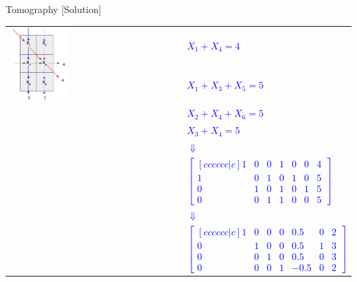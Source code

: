 \begin{frame}{Tomography [Solution]}
    \textcolor{blue}{
        \begin{tabular}{m{} m{}}
            \multirow{2}{*}{\includegraphics[width = 0.35\textwidth]{images/tomography-problem.png}} & 
            $X_1+ X_4 = 4$ \\
            & $X_1 + X_3 + X_5 = 5$ \\[-0.5ex]
            & $X_2 + X_4 + X_6 = 5$ \\[-0.5ex]
            & $X_3+ X_4 = 5$ \\
            & \quad\quad\quad\quad$\Downarrow$ \\
            & $\begin{bmatrix}[cccccc|c]
                1 & 0 & 0 & 1 & 0 & 0 & 4 \\
                1 & 0 & 1 & 0 & 1 & 0 & 5 \\
                0 & 1 & 0 & 1 & 0 & 1 & 5 \\
                0 & 0 & 1 & 1 & 0 & 0 & 5
            \end{bmatrix}$ \\
            & \quad\quad\quad\quad$\Downarrow$ \\
            & $\begin{bmatrix}[cccccc|c]
                1 & 0 & 0 & 0 & 0.5 & 0 & 2 \\
                0 & 1 & 0 & 0 & 0.5 & 1 & 3 \\
                0 & 0 & 1 & 0 & 0.5 & 0 & 3 \\
                0 & 0 & 0 & 1 & -0.5 & 0 & 2
            \end{bmatrix}$
        \end{tabular}
    }
\end{frame}

